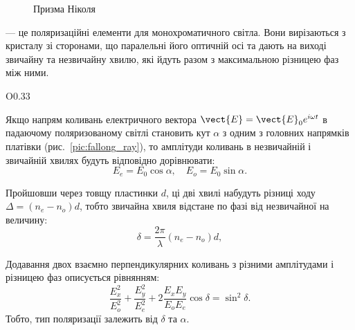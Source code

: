 \begin{figure}[h!]\centering

\caption{Призма Ніколя}
\label{pic:Nicol}
\end{figure}


 --- це поляризаційні елементи для
монохроматичного світла. Вони вирізаються з кристалу зі сторонами, що
паралельні його оптичній осі та дають на виході звичайну та незвичайну
хвилю, які йдуть разом з максимальною різницею фаз між ними.

\begin{wrapfigure}{O}{0.33\linewidth}\centering
\caption{}
\label{pic:fallong_ray}
\end{wrapfigure}
Якщо напрям коливань електричного вектора $ \vect{E} = \vect{E}_0 e^{i\omega t}  $ в падаючому поляризованому світлі становить кут $\alpha$ з одним з головних напрямків платівки (рис.~\ref{pic:fallong_ray}), то амплітуди коливань в незвичайній і звичайній хвилях будуть відповідно дорівнювати:
\begin{equation*}
    E_e = E_0 \cos\alpha,\quad E_o = E_0\sin\alpha.
\end{equation*}


Пройшовши через товщу пластинки $ d $, ці дві хвилі набудуть різниці ходу  $ \Delta = (n_e - n_o) d$, тобто звичайна хвиля відстане по фазі від незвичайної на величину:
\begin{equation}\label{eq:phase_delta}
    \delta = \frac{2\pi}{\lambda} (n_e - n_o) d,
\end{equation}

Додавання двох взаємно перпендикулярних коливань з різними амплітудами і різницею фаз описується рівнянням:
\begin{equation}\label{eq:ellipse_eqn}
    \frac{E_x^2}{E_o^2} + \frac{E_y^2}{E_e^2} + 2\frac{E_xE_y}{E_oE_e}\cos\delta = \sin^2\delta.
\end{equation}
Тобто, тип поляризації залежить від $\delta$ та $ \alpha $.

